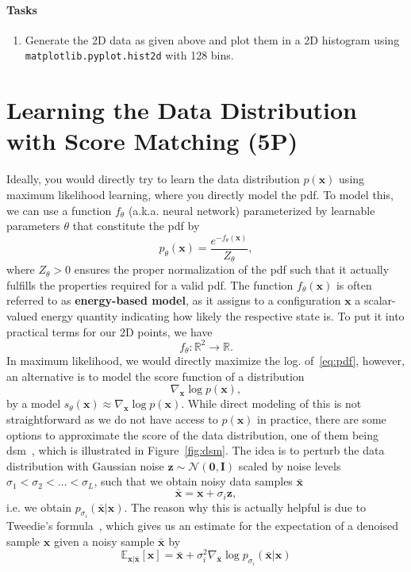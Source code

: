 \documentclass{article}
\renewcommand{\vec}[1]{\textbf{#1}}
\renewcommand{\vec}[1]{\textbf{#1}}
\begin{document}
\paragraph{Tasks}
\begin{enumerate}
\item Generate the 2D data as given above and plot them in a 2D histogram using \texttt{matplotlib.pyplot.hist2d} with 128 bins.
\end{enumerate}

\section{Learning the Data Distribution with Score Matching (5P)}
Ideally, you would directly try to learn the data distribution $p(\vec x)$ using maximum likelihood learning, where you directly model the \gls{pdf}. To model this, we can use a function $f_\theta$ (a.k.a. neural network) parameterized by learnable parameters $\theta$ that constitute the \gls{pdf} by
\begin{equation}\label{eq:pdf}
p_\theta(\vec x) = \frac{e^{-f_\theta(\vec x)}}{Z_\theta},
\end{equation}
where $Z_\theta > 0 $ ensures the proper normalization of the \gls{pdf} such that it actually fulfills the properties required for a valid \gls{pdf}. The function $f_\theta (\vec x)$ is often referred to as \textbf{energy-based model}, as it assigns to a configuration $\vec x$ a scalar-valued energy quantity indicating how likely the respective state is. To put it into practical terms for our 2D points, we have
\begin{equation}\label{eq:ebm}
f_\theta: \mathbb{R}^2 \to \mathbb{R}.
\end{equation} 
In maximum likelihood, we would directly maximize the log. of~\eqref{eq:pdf}, however, an alternative is to model the score function of a distribution
\begin{equation}\label{eq:score}
\nabla_{\vec x} \log p(\vec x),
\end{equation}
by a model $s_\theta(\vec x)\approx \nabla_{\vec x }\log p(\vec x)$. 
While direct modeling of this is not straightforward as we do not have access to  $p(\vec x)$ in practice, there are some options to approximate the score of the data distribution, one of them being \gls{dsm}~\cite{song}, which is illustrated in Figure~\ref{fig:dsm}.
The idea is to perturb the data distribution with Gaussian noise $\vec z \sim \mathcal{N}(\vec 0,\vec I)$ scaled by noise levels $\sigma_1 < \sigma_2 < \dots < \sigma_L$, such that we obtain noisy data samples $\bar{\vec x}$
\[
\bar{\vec x} = \vec x + \sigma_i \vec z,
\]
i.e. we obtain $p_{\sigma_i} (\bar{\vec x}|\vec x)$. 
The reason why this is actually helpful is due to Tweedie's formula~\cite{tweedie}, which gives us an estimate for the expectation of a denoised sample $\vec x$ given a noisy sample $\bar{\vec x}$ by
\begin{equation}
\label{eq:tweedie}
\mathbb{E}_{\vec x|\bar{\vec x}} [\vec x] = \bar{\vec x } + \sigma_i^2 \nabla_{\bar{\vec x}} \log p_{\sigma_i} (\bar{\vec x}| \vec x)
\end{equation}
\end{document}
